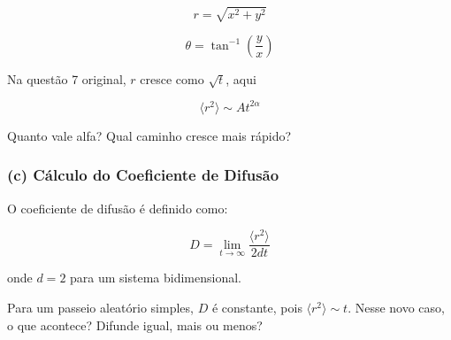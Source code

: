 \documentclass[a4paper,12pt]{article}
\begin{document}
\[
r = \sqrt{x^2 + y^2}
\]

\[
\theta = \tan^{-1} \left(\frac{y}{x}\right)
\]

Na questão 7 original, \( r \) cresce como \( \sqrt{t} \), aqui

\[
\langle r^2 \rangle \sim A t^{2 \alpha}
\]

Quanto vale alfa? Qual caminho cresce mais rápido?

\subsubsection{(c) Cálculo do Coeficiente de Difusão}

O coeficiente de difusão é definido como:

\[
D = \lim_{t \to \infty} \frac{\langle r^2 \rangle}{2d t}
\]

onde \( d = 2 \) para um sistema bidimensional.

Para um passeio aleatório simples, \( D \) é constante, pois \( \langle r^2 \rangle \sim t \). Nesse novo caso, o que acontece? Difunde igual, mais ou menos?
\end{document}
